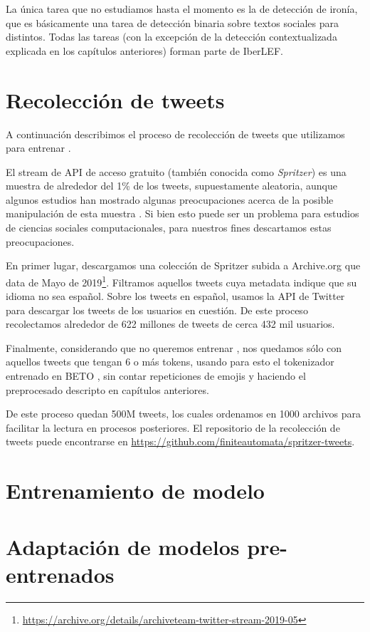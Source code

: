 La única tarea que no estudiamos hasta el momento es la de detección de ironía, que es básicamente una tarea de detección binaria sobre textos sociales para distintos. Todas las tareas (con la excepción de la detección contextualizada explicada en los capítulos anteriores) forman parte de IberLEF.

\section{Recolección de tweets}

A continuación describimos el proceso de recolección de tweets que utilizamos para entrenar \robertuito{}.

El stream de API de acceso gratuito (también conocida como \emph{Spritzer}) es una muestra de alrededor del 1\% de los tweets, supuestamente aleatoria, aunque algunos estudios han mostrado algunas preocupaciones acerca de la posible manipulación de esta muestra \cite{pfeffer2018tampering}. Si bien esto puede ser un problema para estudios de ciencias sociales computacionales, para nuestros fines descartamos estas preocupaciones.

En primer lugar, descargamos una colección de Spritzer subida a Archive.org que data de Mayo de 2019\footnote{\url{https://archive.org/details/archiveteam-twitter-stream-2019-05}}. Filtramos aquellos tweets cuya metadata indique que su idioma no sea español. Sobre los tweets en español, usamos la API de Twitter para descargar los tweets de los usuarios en cuestión. De este proceso recolectamos alrededor de 622 millones de tweets de cerca 432 mil usuarios.

Finalmente, considerando que no queremos entrenar , nos quedamos sólo con aquellos tweets que tengan 6 o más tokens, usando para esto el tokenizador entrenado en BETO \cite{canete2020spanish}, sin contar repeticiones de emojis y haciendo el preprocesado descripto en capítulos anteriores.

De este proceso quedan 500M tweets, los cuales ordenamos en 1000 archivos para facilitar la lectura en procesos posteriores. El repositorio de la recolección de tweets puede encontrarse en \url{https://github.com/finiteautomata/spritzer-tweets}.

\section{Entrenamiento de modelo}

\section{Adaptación de modelos pre-entrenados}

